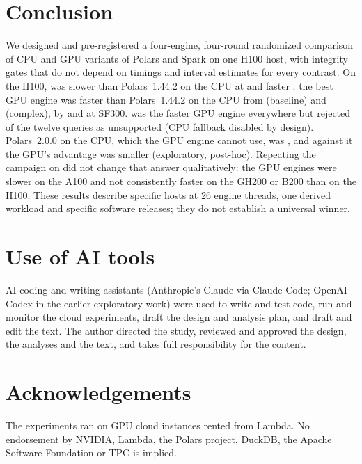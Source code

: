 \documentclass[11pt]{article}
\begin{document}
\section{Conclusion}
\label{sec:conclusion}

We designed and pre-registered a four-engine, four-round randomized comparison
of CPU and GPU variants of Polars and Spark on one H100 host, with integrity
gates that do not depend on timings and interval estimates for every contrast.
On the H100, \polarsgpu{} was slower than Polars~1.44.2 on the CPU at
 and faster ; the best
GPU engine
was faster than Polars~1.44.2 on the CPU from
 (baseline) and
 (complex), by
 and  at SF300.
\polarsgpu{} was the faster GPU engine everywhere but rejected
 of the twelve queries as
unsupported (CPU fallback disabled by design). Polars~2.0.0 on the CPU, which the GPU engine cannot use, was
, and against it the GPU's advantage was smaller
(exploratory, post-hoc).
\ifladderran
Repeating the campaign on  did not change that
answer qualitatively: the GPU engines were slower on the A100 and not
consistently faster on the GH200 or B200 than on the H100.
\fi
These results describe specific hosts at 26 engine threads, one derived
workload and specific software releases; they do not establish a universal
winner.

\section*{Use of AI tools}
AI coding and writing assistants (Anthropic's Claude via Claude Code; OpenAI
Codex in the earlier exploratory work) were used to write and test code, run
and monitor the cloud experiments, draft the design and analysis plan, and
draft and edit the text. The author directed the study, reviewed and approved
the design, the analyses and the text, and takes full responsibility for the
content.

\section*{Acknowledgements}
The experiments ran on GPU cloud instances rented from Lambda. No endorsement by NVIDIA, Lambda,
the Polars project, DuckDB, the Apache Software Foundation or TPC is implied.
\end{document}
